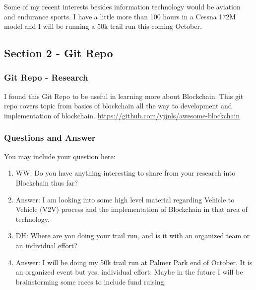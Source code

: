 Some of my recent interests besides information technology would be aviation and endurance sports. I have a little more than 100 hours in a Cessna 172M model and I will be running a 50k trail run this coming October.

\subsection{Section 2 - Git Repo}

\subsubsection{Git Repo - Research}
I found this Git Repo to be useful in learning more about Blockchain. This git repo covers topic from basics of blockchain all the way to development and implementation of blockchain.
\url{https://github.com/yjjnls/awesome-blockchain}


\subsubsection{Questions and Answer} 
You may include your question here:

\begin{enumerate}
    \item WW: Do you have anything interesting to share from your research into Blockchain thus far?
    \item Answer: I am looking into some high level material regarding Vehicle to Vehicle (V2V) process and the implementation of Blockchain in that area of technology.
    \item DH: Where are you doing your trail run, and is it with an organized team or an individual effort?
    \item Answer: I will be doing my 50k trail run at Palmer Park end of October. It is an organized event but yes, individual effort. Maybe in the future I will be brainstorming some races to include fund raising.
\end{enumerate}
